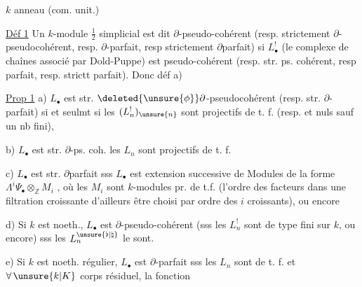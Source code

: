 $k$ anneau (com. unit.)

\uline{Déf 1} Un $k$-module $\frac12$ simplicial  est dit $\partial$-pseudo-cohérent (resp. strictement $\partial$-pseudocohérent, resp. $\partial$-parfait, resp strictement $\partial$parfait) si $L_\bullet^!$ (le complexe de chaînes associé par Dold-Puppe) est pseudo-cohérent (resp. str. ps. cohérent, resp parfait, resp. strictt parfait). Donc  déf a) 

\uline{Prop 1} a) $L_\bullet$ est str. $\deleted{\unsure{\phi}}\partial$-pseudocohérent (resp. str. $\partial$-parfait) si et seulmt si les $(L_n^!)_{\unsure{n}}$ sont projectifs de t. f. (resp. et nuls sauf un nb fini), 

b) $L_\bullet$ est str. $\partial$-ps. coh.  les $L_n$ sont projectifs de t. f.

c) $L_\bullet$ est str. $\partial$parfait sss $L_\bullet$ est extension successive  de Modules de la forme $\Lambda^i\Psi_\bullet\otimes_{\mathbb Z}M_i$ , où les $M_i$ sont $k$-modules pr. de t.f. (l'ordre des facteurs dans une filtration croissante  d'ailleurs être choisi par ordre des $i$ croissants), ou encore  

d) Si $k$ est noeth., $L_\bullet$ est $\partial$-pseudo-cohérent (sss les $L_n^!$ sont de type fini sur $k$, ou encore) sss les $L_n^{\unsure{\flat|\natural}}$ le sont.

e) Si $k$ est noeth. régulier, $L_\bullet$ est $\partial$-parfait sss les $L_n$ sont de t. f. et  $\forall\,\unsure{k|K}$ corps résiduel, la fonction
